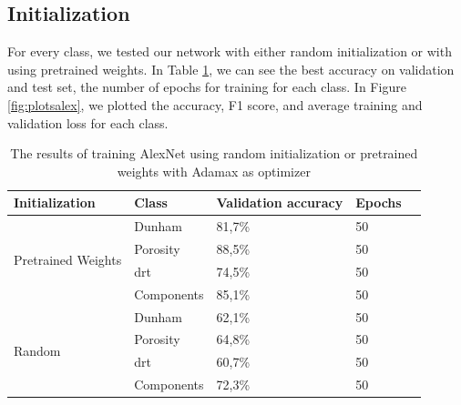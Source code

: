 \subsection{Initialization}
For every class, we tested our network with either random initialization or with using pretrained weights. In Table \ref{tab:alexinit}, we can see the best accuracy on validation and test set, the number of epochs for training for each class.  
In Figure \ref{fig:plotsalex}, we plotted the accuracy, F1 score, and average training and validation loss for each class. 
\begin{table}
\caption[Results according to initialization of AlexNet]{\label{tab:alexinit} The results of training AlexNet using random initialization or pretrained weights with Adamax as optimizer}
\centering
\begin{tabular}[b]{| l | l | l | l | l |}
\hline
    Initialization & Class & Validation accuracy  & Epochs\\ \hline
    \multirow{4}{*}{Pretrained Weights} & Dunham &  81,7\%  & 50 \\ %
    & Porosity & 88,5\% &  50 \\
    &\gls{drt} & 74,5\% &  50 \\
    &Components & 85,1\% &  50 \\ \hline
     \multirow{4}{*}{Random} & Dunham &  62,1\% & 50 \\
    & Porosity & 64,8\% &  50 \\
    &\gls{drt} & 60,7\% &  50 \\
    &Components & 72,3\% & 50 \\ \hline
\end{tabular} 
\end{table}

